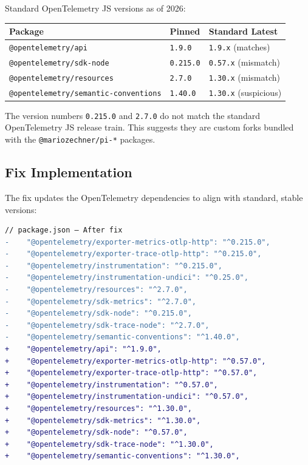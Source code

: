 Standard OpenTelemetry JS versions as of 2026:

\begin{tabular}{lll}
\textbf{Package} & \textbf{Pinned} & \textbf{Standard Latest} \\
\hline
\texttt{@opentelemetry/api} & \texttt{1.9.0} & \texttt{1.9.x} (matches) \\
\texttt{@opentelemetry/sdk-node} & \texttt{0.215.0} & \texttt{0.57.x} (mismatch) \\
\texttt{@opentelemetry/resources} & \texttt{2.7.0} & \texttt{1.30.x} (mismatch) \\
\texttt{@opentelemetry/semantic-conventions} & \texttt{1.40.0} & \texttt{1.30.x} (suspicious) \\
\end{tabular}

The version numbers \texttt{0.215.0} and \texttt{2.7.0} do not match the standard OpenTelemetry JS release train. This suggests they are custom forks bundled with the \texttt{@mariozechner/pi-*} packages.

\subsection*{Fix Implementation}

The fix updates the OpenTelemetry dependencies to align with standard, stable versions:

\begin{lstlisting}[language=diff]
// package.json — After fix
-    "@opentelemetry/exporter-metrics-otlp-http": "^0.215.0",
-    "@opentelemetry/exporter-trace-otlp-http": "^0.215.0",
-    "@opentelemetry/instrumentation": "^0.215.0",
-    "@opentelemetry/instrumentation-undici": "^0.25.0",
-    "@opentelemetry/resources": "^2.7.0",
-    "@opentelemetry/sdk-metrics": "^2.7.0",
-    "@opentelemetry/sdk-node": "^0.215.0",
-    "@opentelemetry/sdk-trace-node": "^2.7.0",
-    "@opentelemetry/semantic-conventions": "^1.40.0",
+    "@opentelemetry/api": "^1.9.0",
+    "@opentelemetry/exporter-metrics-otlp-http": "^0.57.0",
+    "@opentelemetry/exporter-trace-otlp-http": "^0.57.0",
+    "@opentelemetry/instrumentation": "^0.57.0",
+    "@opentelemetry/instrumentation-undici": "^0.57.0",
+    "@opentelemetry/resources": "^1.30.0",
+    "@opentelemetry/sdk-metrics": "^1.30.0",
+    "@opentelemetry/sdk-node": "^0.57.0",
+    "@opentelemetry/sdk-trace-node": "^1.30.0",
+    "@opentelemetry/semantic-conventions": "^1.30.0",
\end{lstlisting}

